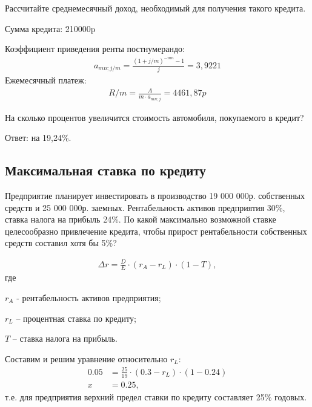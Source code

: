 \documentclass[12pt, table, a4paper,twoside]{exam}
\begin{document}
\begin{questions}
\begin{subparts}
	\subpart[12] Рассчитайте среднемесячный доход, необходимый для получения такого кредита.
	\begin{solution}[12em]
		
		Сумма кредита: 210000p
		
		Коэффициент приведения ренты постнумерандо:
		\begin{align}
		a_{mn;j/m}=\frac{(1+j/m)^{-mn}-1}{j}=3,9221			
		\end{align}
		Ежемесячный платеж:
		\begin{align}
		R/m=\frac{A}{m \cdot a_{mn;j}} = 4461,87p
		\end{align} 
	\end{solution}
	
	\subpart[3] На сколько процентов увеличится стоимость автомобиля, покупаемого в кредит?
	
	\begin{solution}[12em]
		
	Ответ: на 19,24\%.
	\end{solution}
	
\end{subparts}
\addpoints


\vfill\null\pagebreak
\subsection{Максимальная ставка по кредиту}
\question[10] Предприятие планирует инвестировать в производство 19 000 000р. собственных средств и 25 000 000р. заемных. Рентабельность активов предприятия 30\%, ставка налога на прибыль 24\%. По какой максимально возможной ставке целесообразно привлечение кредита, чтобы прирост рентабельности собственных средств составил хотя бы 5\%?

\begin{solution}[12em]
\begin{align}
\Delta r=\frac{D}{E} \cdot (r_A - r_L ) \cdot (1 - T),
\end{align}	
где

$r_A$ -  рентабельность активов предприятия;

$r_L$ – процентная ставка по кредиту;

$T$ – ставка налога на прибыль.

Составим и решим уравнение относительно $r_L$:
	\begin{align*}
	0.05&=\frac{25}{19} \cdot (0.3 - r_L) \cdot (1 - 0.24)\\
	x&=0.25,
	\end{align*}
 т.е. для предприятия верхний предел ставки по кредиту составляет 25\% годовых.
\end{solution}


\end{questions}
\end{document}
